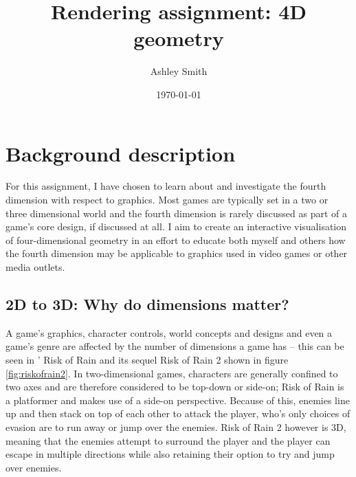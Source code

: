 \documentclass[11pt, a4paper]{article}
\begin{document}
\title{\titlefont Rendering assignment: 4D geometry}
\author{Ashley Smith}
\date{\today}
\maketitle
\thispagestyle{empty}


\cleardoublepage
\setcounter{page}{1}
\tableofcontents

\cleardoublepage
{}
\setcounter{page}{1}

\section{Background description}

For this assignment, I have chosen to learn about and investigate the fourth dimension with respect to graphics. Most games are typically set in a two or three dimensional world and the fourth dimension is rarely discussed as part of a game's core design, if discussed at all. I aim to create an interactive visualisation of four-dimensional geometry in an effort to educate both myself and others how the fourth dimension may be applicable to graphics used in video games or other media outlets.

\subsection{2D to 3D: Why do dimensions matter?}

A game's graphics, character controls, world concepts and designs and even a game's genre are affected by the number of dimensions a game has -- this can be seen in \citeauthor*{riskofrain}' Risk of Rain \parencite*{riskofrain} and its sequel Risk of Rain 2 \parencite{riskofrain2} shown in figure \ref{fig:riskofrain2}. In two-dimensional games, characters are generally confined to two axes and are therefore considered to be top-down or side-on; Risk of Rain is a platformer and makes use of a side-on perspective. Because of this, enemies line up and then stack on top of each other to attack the player, who's only choices of evasion are to run away or jump over the enemies. Risk of Rain 2 however is 3D, meaning that the enemies attempt to surround the player and the player can escape in multiple directions while also retaining their option to try and jump over enemies.
\end{document}
